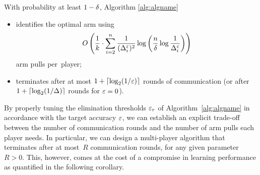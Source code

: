 \documentclass{article} %
\newcommand{\Dele}{\Del^{\eps}}
\begin{document}
\begin{theorem} \label{thm:main1}

With probability at least $1-\delta$, Algorithm \ref{alg:algname}
\begin{itemize}
\item
identifies the optimal arm using
\begin{align*}
	\OO{
		\frac{1}{k} \cdot \sum_{i=2}^{n}
		\frac{1}{(\Dele_i)^2} \log \left(\frac{n}{\del} \log \frac{1}{\Dele_i}\right)
	}
\end{align*}
arm pulls per~player;
\end{itemize}

\begin{itemize} %
\item
terminates after at most $1+\lceil\log_2(1/\varepsilon)\rceil$ rounds of communication (or after $1+\lceil\log_2(1/\Delta)\rceil$ rounds for $\varepsilon=0$).
\end{itemize}

\end{theorem}








By properly tuning the elimination thresholds $\varepsilon_r$ of Algorithm~\ref{alg:algname} in accordance with the target accuracy $\varepsilon$, we can establish an explicit trade-off between the number of communication rounds and the number of arm pulls each player needs.
In particular, we can design a multi-player algorithm that terminates after at
most~$R$ communication rounds, for any given parameter $R>0$.
This, however, comes at the cost of a compromise in learning performance as quantified in the following corollary.
\end{document}
